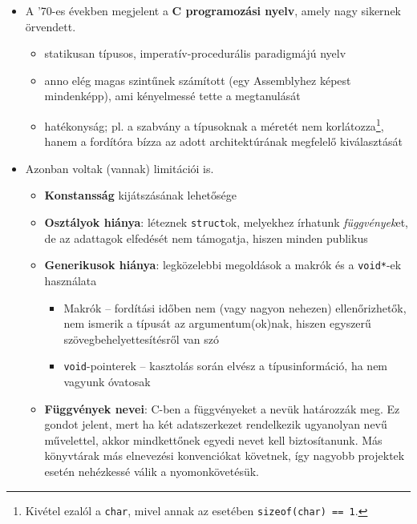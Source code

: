 \documentclass[a4paper, 11pt, oneside]{book}
\begin{document}
\begin{itemize}
	\item A '70-es években megjelent a \textbf{C programozási nyelv}, amely nagy sikernek örvendett.
	
	\begin{itemize}
		\item statikusan típusos, imperatív-procedurális paradigmájú nyelv
		\item anno elég magas szintűnek számított (egy Assemblyhez képest mindenképp), ami kényelmessé tette a megtanulását
		\item hatékonyság; pl. a szabvány a típusoknak a méretét nem korlátozza\footnote{Kivétel ezalól a \verb*|char|, mivel annak az esetében \verb|sizeof(char) == 1|.}, hanem a fordítóra bízza az adott architektúrának megfelelő kiválasztását
	\end{itemize}
	
	\item Azonban voltak (vannak) limitációi is.
	
	\begin{itemize}
		
		\item \textbf{Konstansság} kijátszásának lehetősége
		
		\item \textbf{Osztályok hiánya}: léteznek \verb|struct|ok, melyekhez írhatunk \textit{függvények}et, de az adattagok elfedését nem támogatja, hiszen minden publikus
		
		\item \textbf{Generikusok hiánya}: legközelebbi megoldások a makrók és a \verb|void*|-ek használata
		
		\begin{itemize}
			\item Makrók -- fordítási időben nem (vagy nagyon nehezen) ellenőrizhetők, nem ismerik a típusát az argumentum(ok)nak, hiszen egyszerű szövegbehelyettesítésről van szó
			\item \verb|void|-pointerek -- kasztolás során elvész a típusinformáció, ha nem vagyunk óvatosak
			
		\end{itemize}
		
		\item \textbf{Függvények nevei}: C-ben a függvényeket a nevük határozzák meg. Ez gondot jelent, mert ha két adatszerkezet rendelkezik ugyanolyan nevű művelettel, akkor mindkettőnek egyedi nevet kell biztosítanunk. Más könyvtárak más elnevezési konvenciókat követnek, így nagyobb projektek esetén nehézkessé válik a nyomonkövetésük.
		

\end{itemize}
\end{itemize}
\end{document}
